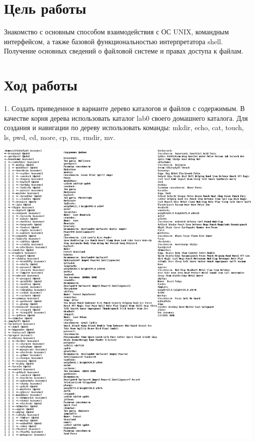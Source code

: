 \documentclass{article}
\begin{document}
\newpage


\section*{Цель работы}
Знакомство с основным способом взаимодействия с ОС UNIX,
командным интерфейсом, а также базовой функциональностью
интерпретатора shell. Получение основных сведений о файловой
системе и правах доступа к файлам.

\section*{Ход работы}


1. Создать приведенное в варианте дерево каталогов и файлов с содержимым. В качестве корня дерева использовать каталог lab0 своего домашнего каталога. Для создания и навигации по дереву использовать команды: mkdir, echo, cat, touch, ls, pwd, cd, more, cp, rm, rmdir, mv.

\vspace*{\fill}
\includegraphics[width=\textwidth]{files.png}
\end{document}
